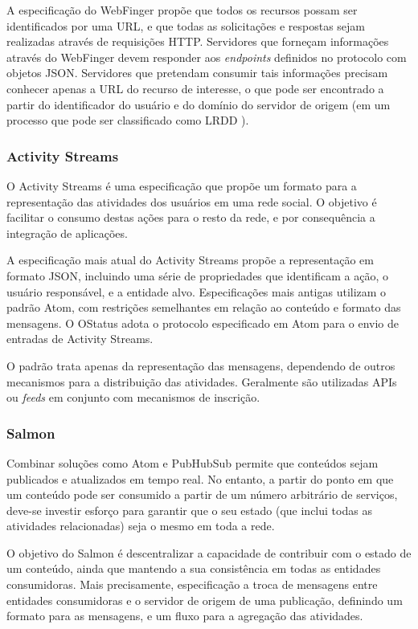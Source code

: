 A especificação do WebFinger propõe que todos os recursos possam ser identificados
por uma URL, e que todas as solicitações e respostas sejam realizadas através de
requisições HTTP. Servidores que forneçam informações através do WebFinger devem
responder aos \textit{endpoints} definidos no protocolo com objetos JSON. Servidores
que pretendam consumir tais informações precisam conhecer apenas a URL do recurso de
interesse, o que pode ser encontrado a partir do identificador do usuário e do
domínio do servidor de origem (em um processo que pode ser classificado como LRDD
\cite{lrdd2010}). 

\subsubsection{Activity Streams}

O Activity Streams é uma especificação que propõe um formato para a representação
das atividades dos usuários em uma rede social. O objetivo é facilitar o consumo
destas ações para o resto da rede, e por consequência a integração de aplicações.

A especificação mais atual do Activity Streams propõe a representação em formato
JSON, incluindo uma série de propriedades que identificam a ação, o usuário
responsável, e a entidade alvo. Especificações mais antigas utilizam o padrão Atom,
com restrições semelhantes em relação ao conteúdo e formato das mensagens. O OStatus
adota o protocolo especificado em Atom para o envio de entradas de Activity Streams.

O padrão trata apenas da representação das mensagens, dependendo de outros
mecanismos para a distribuição das atividades. Geralmente são utilizadas APIs ou
\textit{feeds} em conjunto com mecanismos de inscrição.

\subsubsection{Salmon}

Combinar soluções como Atom e PubHubSub permite que conteúdos sejam publicados e
atualizados em tempo real. No entanto, a partir do ponto em que um conteúdo pode ser
consumido a partir de um número arbitrário de serviços, deve-se investir esforço
para garantir que o seu estado (que inclui todas as atividades relacionadas) seja o
mesmo em toda a rede.

O objetivo do Salmon é descentralizar a capacidade de contribuir com o estado de um
conteúdo, ainda que mantendo a sua consistência em todas as entidades consumidoras.
Mais precisamente, especificação a troca de mensagens entre entidades consumidoras
e o servidor de origem de uma publicação, definindo um formato para as mensagens, e
um fluxo para a agregação das atividades.

